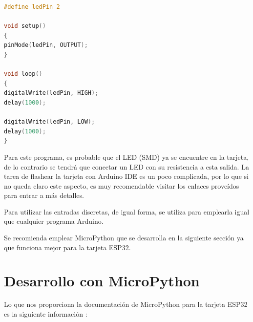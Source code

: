 \documentclass[conference]{IEEEtran}
\begin{document}
\begin{lstlisting}[language=C, caption={Programa que hace parpadear el LED en
el pin 2}]
#define ledPin 2

void setup()
{
pinMode(ledPin, OUTPUT);
}

void loop()
{
digitalWrite(ledPin, HIGH);
delay(1000);

digitalWrite(ledPin, LOW);
delay(1000);
}
\end{lstlisting}

Para este programa, es probable que el LED (SMD) ya se encuentre en la
tarjeta, de lo contrario se tendrá que conectar un LED con su resistencia a
esta salida. La tarea de flashear la tarjeta con Arduino IDE es un poco
complicada, por lo que si no queda claro este aspecto, es muy recomendable
visitar los enlaces proveídos para entrar a más detalles.

\bigbreak

Para utilizar las entradas discretas, de igual forma, se utiliza  para emplearla igual que cualquier programa Arduino.

\bigbreak

Se recomienda emplear MicroPython que se desarrolla en la siguiente sección
ya que funciona mejor para la tarjeta ESP32.

\section{Desarrollo con MicroPython}

Lo que nos proporciona la documentación de MicroPython para la tarjeta ESP32
es la siguiente información \cite{micropython-esp32}:
\end{document}
